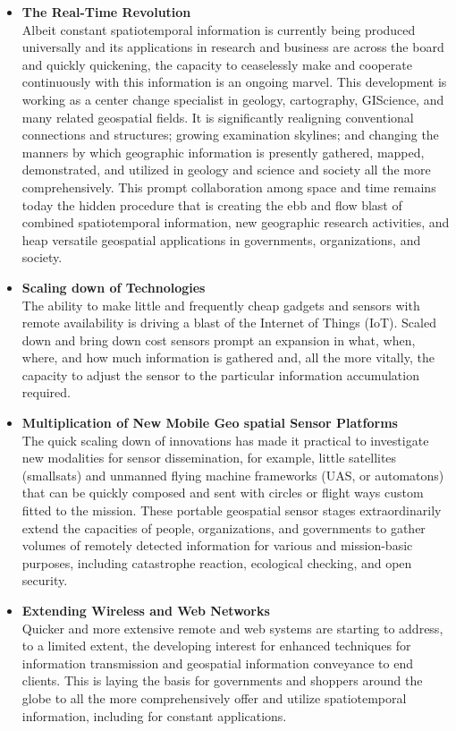 \begin{itemize}
  \item \textbf{The Real-Time Revolution} \\
  Albeit constant spatiotemporal information is currently being produced universally and its applications in research and business are across the board and quickly quickening, the capacity to ceaselessly make and cooperate continuously with this information is an ongoing marvel. This development is working as a center change specialist in geology, cartography, GIScience, and many related geospatial fields. It is significantly realigning conventional connections and structures; growing examination skylines; and changing the manners by which geographic information is presently gathered, mapped, demonstrated, and utilized in geology and science and society all the more comprehensively. This prompt collaboration among space and time remains today the hidden procedure that is creating the ebb and flow blast of combined spatiotemporal information, new geographic research activities, and heap versatile geospatial applications in governments, organizations, and society. 
  
  \item  \textbf{Scaling down of Technologies} \\
 The ability to make little and frequently cheap gadgets and sensors with remote availability is driving a blast of the Internet of Things (IoT). Scaled down and bring down cost sensors prompt an expansion in what, when, where, and how much information is gathered and, all the more vitally, the capacity to adjust the sensor to the particular information accumulation required. 
  
  \item  \textbf{Multiplication of New Mobile Geo spatial Sensor Platforms} \\
  The quick scaling down of innovations has made it practical to investigate new modalities for sensor dissemination, for example, little satellites (smallsats) and unmanned flying machine frameworks (UAS, or automatons) that can be quickly composed and sent with circles or flight ways custom fitted to the mission. These portable geospatial sensor stages extraordinarily extend the capacities of people, organizations, and governments to gather volumes of remotely detected information for various and mission-basic purposes, including catastrophe reaction, ecological checking, and open security. 
  
  \item  \textbf{Extending Wireless and Web Networks} \\
 Quicker and more extensive remote and web systems are starting to address, to a limited extent, the developing interest for enhanced techniques for information transmission and geospatial information conveyance to end clients. This is laying the basis for governments and shoppers around the globe to all the more comprehensively offer and utilize spatiotemporal information, including for constant applications. 
  

\end{itemize}
